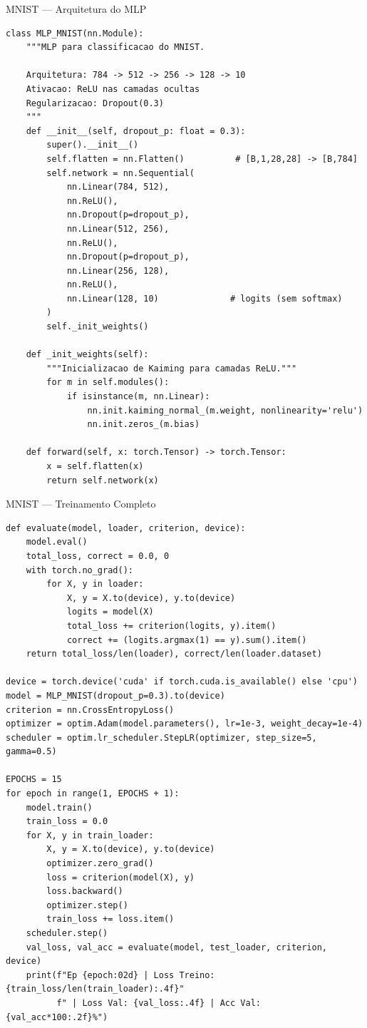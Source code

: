 \documentclass[7pt, aspectratio=169,10pt]{beamer}
\begin{document}
\begin{frame}[fragile]{MNIST — Arquitetura do MLP}
\begin{lstlisting}
class MLP_MNIST(nn.Module):
    """MLP para classificacao do MNIST.
    
    Arquitetura: 784 -> 512 -> 256 -> 128 -> 10
    Ativacao: ReLU nas camadas ocultas
    Regularizacao: Dropout(0.3)
    """
    def __init__(self, dropout_p: float = 0.3):
        super().__init__()
        self.flatten = nn.Flatten()          # [B,1,28,28] -> [B,784]
        self.network = nn.Sequential(
            nn.Linear(784, 512),
            nn.ReLU(),
            nn.Dropout(p=dropout_p),
            nn.Linear(512, 256),
            nn.ReLU(),
            nn.Dropout(p=dropout_p),
            nn.Linear(256, 128),
            nn.ReLU(),
            nn.Linear(128, 10)              # logits (sem softmax)
        )
        self._init_weights()
    
    def _init_weights(self):
        """Inicializacao de Kaiming para camadas ReLU."""
        for m in self.modules():
            if isinstance(m, nn.Linear):
                nn.init.kaiming_normal_(m.weight, nonlinearity='relu')
                nn.init.zeros_(m.bias)
    
    def forward(self, x: torch.Tensor) -> torch.Tensor:
        x = self.flatten(x)
        return self.network(x)
\end{lstlisting}
\end{frame}

\begin{frame}[fragile]{MNIST — Treinamento Completo}
\begin{lstlisting}
def evaluate(model, loader, criterion, device):
    model.eval()
    total_loss, correct = 0.0, 0
    with torch.no_grad():
        for X, y in loader:
            X, y = X.to(device), y.to(device)
            logits = model(X)
            total_loss += criterion(logits, y).item()
            correct += (logits.argmax(1) == y).sum().item()
    return total_loss/len(loader), correct/len(loader.dataset)

device = torch.device('cuda' if torch.cuda.is_available() else 'cpu')
model = MLP_MNIST(dropout_p=0.3).to(device)
criterion = nn.CrossEntropyLoss()
optimizer = optim.Adam(model.parameters(), lr=1e-3, weight_decay=1e-4)
scheduler = optim.lr_scheduler.StepLR(optimizer, step_size=5, gamma=0.5)

EPOCHS = 15
for epoch in range(1, EPOCHS + 1):
    model.train()
    train_loss = 0.0
    for X, y in train_loader:
        X, y = X.to(device), y.to(device)
        optimizer.zero_grad()
        loss = criterion(model(X), y)
        loss.backward()
        optimizer.step()
        train_loss += loss.item()
    scheduler.step()
    val_loss, val_acc = evaluate(model, test_loader, criterion, device)
    print(f"Ep {epoch:02d} | Loss Treino: {train_loss/len(train_loader):.4f}"
          f" | Loss Val: {val_loss:.4f} | Acc Val: {val_acc*100:.2f}%")
\end{lstlisting}
\end{frame}
\end{document}
